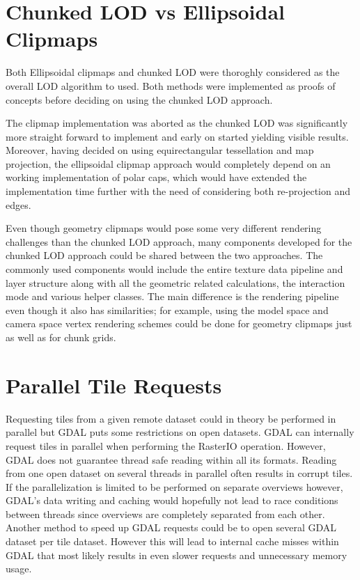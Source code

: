 \section{Chunked LOD vs Ellipsoidal Clipmaps}
Both Ellipsoidal clipmaps and chunked LOD were thoroghly considered as the overall LOD algorithm to used. Both methods were implemented as proofs of concepts before deciding on using the chunked LOD approach.

The clipmap implementation was aborted as the chunked LOD was significantly more straight forward to implement and early on started yielding visible results. Moreover, having decided on using equirectangular tessellation and map projection, the ellipsoidal clipmap approach would completely depend on an working implementation of polar caps, which would have extended the implementation time further with the need of considering both re-projection and edges.

Even though geometry clipmaps would pose some very different rendering challenges than the chunked LOD approach, many components developed for the chunked LOD approach could be shared between the two approaches.
The commonly used components would include the entire texture data pipeline and layer structure along with all the geometric related calculations, the interaction mode and various helper classes. The main difference is the rendering pipeline even though it also has similarities; for example, using the model space and camera space vertex rendering schemes could be done for geometry clipmaps just as well as for chunk grids.

\section{Parallel Tile Requests}
\label{section:parallelrequests}
Requesting tiles from a given remote dataset could in theory be performed in parallel but GDAL puts some restrictions on open datasets. GDAL can internally request tiles in parallel when performing the RasterIO operation. However, GDAL does not guarantee thread safe reading within all its formats. Reading from one open dataset on several threads in parallel often results in corrupt tiles. If the parallelization is limited to be performed on separate overviews however, GDAL's data writing and caching would hopefully not lead to race conditions between threads since overviews are completely separated from each other. Another method to speed up GDAL requests could be to open several GDAL dataset per tile dataset. However this will lead to internal cache misses within GDAL that most likely results in even slower requests and unnecessary memory usage.

